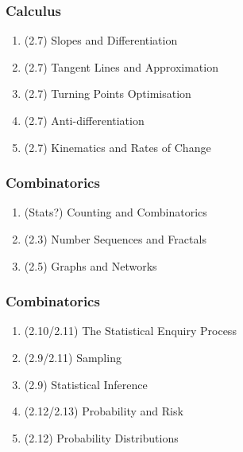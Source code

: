 \subsubsection*{Calculus}
\begin{enumerate}[resume]
  \item (2.7) Slopes and Differentiation
  \item (2.7) Tangent Lines and Approximation
  \item (2.7) Turning Points Optimisation
  \item (2.7) Anti-differentiation
  \item (2.7) Kinematics and Rates of Change
\end{enumerate}

\subsubsection*{Combinatorics}
\begin{enumerate}[resume]
  \item (Stats?) Counting and Combinatorics
  \item (2.3) Number Sequences and Fractals
  \item (2.5) Graphs and Networks
\end{enumerate}

\subsubsection*{Combinatorics}
\begin{enumerate}[resume]
  \item (2.10/2.11) The Statistical Enquiry Process
  \item (2.9/2.11) Sampling
  \item (2.9) Statistical Inference
  \item (2.12/2.13) Probability and Risk
  \item (2.12) Probability Distributions
\end{enumerate}


